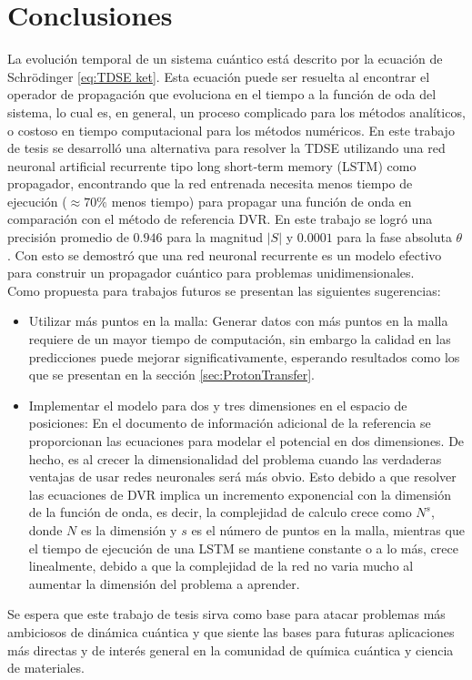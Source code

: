\chapter{Conclusiones}\label{ch:Conclusiones}
La evolución temporal de un sistema cuántico está descrito por la ecuación de Schrödinger \autoref{eq:TDSE ket}. Esta ecuación puede ser resuelta al encontrar el operador de propagación que evoluciona en el tiempo a la función de oda del sistema, lo cual es, en general, un proceso complicado para los métodos analíticos, o costoso en tiempo computacional para los métodos numéricos. En este trabajo de tesis se desarrolló una alternativa para resolver la \acs{TDSE} utilizando una red neuronal artificial recurrente tipo long short‐term memory (\acs{LSTM}) como propagador, encontrando que la red entrenada necesita menos tiempo de ejecución ($\approx 70\%$ menos tiempo) para propagar una función de onda en comparación con el método de referencia \acs{DVR}. En este trabajo se logró una precisión promedio de $0.946$ para la magnitud $|S|$ y $0.0001$ para la fase absoluta $\theta$. Con esto se demostró que una red neuronal recurrente es un modelo efectivo para construir un propagador cuántico para problemas unidimensionales.\\

Como propuesta para trabajos futuros se presentan las siguientes sugerencias:
\begin{itemize}[label=\textcolor{CTtitle}{\textbullet}]
\item Utilizar más puntos en la malla: Generar datos con más puntos en la malla requiere de un mayor tiempo de computación, sin embargo la calidad en las predicciones puede mejorar significativamente, esperando resultados como los que se presentan en la sección \autoref{sec:ProtonTransfer}. 
\item Implementar el modelo para dos y tres dimensiones en el espacio de posiciones: En el documento de información adicional de la referencia \cite{Main:2021} se proporcionan las ecuaciones para modelar el potencial en dos dimensiones. De hecho, es al crecer la dimensionalidad del problema cuando las verdaderas ventajas de usar redes neuronales será más obvio. Esto debido a que resolver las ecuaciones de \acs{DVR} implica un incremento exponencial con la dimensión de la función de onda, es decir, la complejidad de calculo crece como $N^{s}$, donde $N$ es la dimensión y $s$ es el número de puntos en la malla, mientras que el tiempo de ejecución de una \acs{LSTM} se mantiene constante o a lo más, crece linealmente, debido a que la complejidad de la red no varia mucho al aumentar la dimensión del problema a aprender.
\end{itemize}
Se espera que este trabajo de tesis sirva como base para atacar problemas más ambiciosos de dinámica cuántica y que siente las bases para futuras aplicaciones más directas y de interés general en la comunidad de química cuántica y ciencia de materiales.